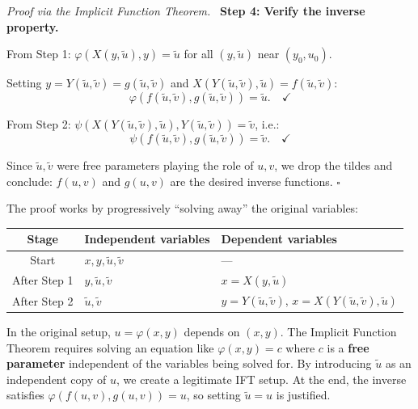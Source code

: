 \documentclass[11pt]{report}
\renewenvironment{proof}[1][Proof]{\par\noindent\textit{#1.}\ }{\hfill$\square$\par\medskip}
\begin{document}
\begin{proof}[Proof via the Implicit Function Theorem]
\medskip
\textbf{Step 4: Verify the inverse property.}

From Step 1: $\varphi(X(y, \tilde{u}), y) = \tilde{u}$ for all $(y, \tilde{u})$ near $(y_0, u_0)$.

Setting $y = Y(\tilde{u}, \tilde{v}) = g(\tilde{u}, \tilde{v})$ and $X(Y(\tilde{u}, \tilde{v}), \tilde{u}) = f(\tilde{u}, \tilde{v})$:
\[
\varphi(f(\tilde{u}, \tilde{v}), g(\tilde{u}, \tilde{v})) = \tilde{u}. \quad \checkmark
\]

From Step 2: $\psi(X(Y(\tilde{u}, \tilde{v}), \tilde{u}), Y(\tilde{u}, \tilde{v})) = \tilde{v}$, i.e.:
\[
\psi(f(\tilde{u}, \tilde{v}), g(\tilde{u}, \tilde{v})) = \tilde{v}. \quad \checkmark
\]

Since $\tilde{u}, \tilde{v}$ were free parameters playing the role of $u, v$, we drop the tildes and conclude: $f(u, v)$ and $g(u, v)$ are the desired inverse functions.
\end{proof}

\begin{remark}
The proof works by progressively ``solving away'' the original variables:
\begin{center}
\begin{tabular}{|c|l|l|}
\hline
\textbf{Stage} & \textbf{Independent variables} & \textbf{Dependent variables} \\
\hline
Start & $x, y, \tilde{u}, \tilde{v}$ & --- \\
\hline
After Step 1 & $y, \tilde{u}, \tilde{v}$ & $x = X(y, \tilde{u})$ \\
\hline
After Step 2 & $\tilde{u}, \tilde{v}$ & $y = Y(\tilde{u}, \tilde{v})$, \; $x = X(Y(\tilde{u},\tilde{v}), \tilde{u})$ \\
\hline
\end{tabular}
\end{center}
\end{remark}

\begin{remark}
In the original setup, $u = \varphi(x,y)$ depends on $(x,y)$. The Implicit Function Theorem requires solving an equation like $\varphi(x,y) = c$ where $c$ is a \textbf{free parameter} independent of the variables being solved for. By introducing $\tilde{u}$ as an independent copy of $u$, we create a legitimate IFT setup. At the end, the inverse satisfies $\varphi(f(u,v), g(u,v)) = u$, so setting $\tilde{u} = u$ is justified.
\end{remark}
\end{document}
